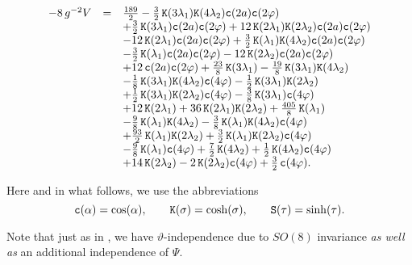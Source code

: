 \documentclass[a4paper,12pt]{article}
\begin{document}
\begin{equation}
\begin{array}{lll}
-8\,g^{-2}V&=&\frac{189}{2}-
\frac{3}{2}\,{\tt K}{\left(3 \lambda_1\right)} {\tt K}{\left(4 \lambda_2\right)} {\tt c}{\left(2 a\right)} {\tt c}{\left(2 \varphi\right)}\\
&&+\frac{3}{2}\,{\tt K}{\left(3 \lambda_1\right)} {\tt c}{\left(2 a\right)} {\tt c}{\left(2 \varphi\right)}
+12\,{\tt K}{\left(2 \lambda_1\right)} {\tt K}{\left(2 \lambda_2\right)} {\tt c}{\left(2 a\right)} {\tt c}{\left(2 \varphi\right)}\\
&&-12\,{\tt K}{\left(2 \lambda_1\right)} {\tt c}{\left(2 a\right)} {\tt c}{\left(2 \varphi\right)}
+\frac{3}{2}\,{\tt K}{\left( \lambda_1\right)} {\tt K}{\left(4 \lambda_2\right)} {\tt c}{\left(2 a\right)} {\tt c}{\left(2 \varphi\right)}\\
&&-\frac{3}{2}\,{\tt K}{\left( \lambda_1\right)} {\tt c}{\left(2 a\right)} {\tt c}{\left(2 \varphi\right)}
-12\,{\tt K}{\left(2 \lambda_2\right)} {\tt c}{\left(2 a\right)} {\tt c}{\left(2 \varphi\right)}\\
&&+12\,{\tt c}{\left(2 a\right)} {\tt c}{\left(2 \varphi\right)}
+\frac{23}{8}\,{\tt K}{\left(3 \lambda_1\right)}
-\frac{19}{8}\,{\tt K}{\left(3 \lambda_1\right)} {\tt K}{\left(4 \lambda_2\right)}\\
&&-\frac{1}{8}\,{\tt K}{\left(3 \lambda_1\right)} {\tt K}{\left(4 \lambda_2\right)} {\tt c}{\left(4 \varphi\right)}
-\frac{1}{2}\,{\tt K}{\left(3 \lambda_1\right)} {\tt K}{\left(2 \lambda_2\right)}\\
&&+\frac{1}{2}\,{\tt K}{\left(3 \lambda_1\right)} {\tt K}{\left(2 \lambda_2\right)} {\tt c}{\left(4 \varphi\right)}
-\frac{3}{8}\,{\tt K}{\left(3 \lambda_1\right)} {\tt c}{\left(4 \varphi\right)}\\
&&+12\,{\tt K}{\left(2 \lambda_1\right)}
+36\,{\tt K}{\left(2 \lambda_1\right)} {\tt K}{\left(2 \lambda_2\right)}
+\frac{405}{8}\,{\tt K}{\left( \lambda_1\right)}\\
&&-\frac{9}{8}\,{\tt K}{\left( \lambda_1\right)} {\tt K}{\left(4 \lambda_2\right)}
-\frac{3}{8}\,{\tt K}{\left( \lambda_1\right)} {\tt K}{\left(4 \lambda_2\right)} {\tt c}{\left(4 \varphi\right)}\\
&&+\frac{93}{2}\,{\tt K}{\left( \lambda_1\right)} {\tt K}{\left(2 \lambda_2\right)}
+\frac{3}{2}\,{\tt K}{\left( \lambda_1\right)} {\tt K}{\left(2 \lambda_2\right)} {\tt c}{\left(4 \varphi\right)}\\
&&-\frac{9}{8}\,{\tt K}{\left( \lambda_1\right)} {\tt c}{\left(4 \varphi\right)}
+\frac{7}{2}\,{\tt K}{\left(4 \lambda_2\right)}
+\frac{1}{2}\,{\tt K}{\left(4 \lambda_2\right)} {\tt c}{\left(4 \varphi\right)}\\
&&+14\,{\tt K}{\left(2 \lambda_2\right)}
-2\,{\tt K}{\left(2 \lambda_2\right)} {\tt c}{\left(4 \varphi\right)}
+\frac{3}{2}\,{\tt c}{\left(4 \varphi\right)}.
\end{array}
\end{equation}

Here and in what follows, we use the abbreviations
\begin{equation}
{\tt c}{\left(\alpha\right)}=\cos(\alpha),\qquad {\tt K}{\left(\sigma\right)}=\cosh(\sigma),\qquad {\tt S}{\left(\tau\right)}=\sinh(\tau).
\end{equation}

Note that just as in \cite{Warner:vz}, we have
$\vartheta$-independence due to $SO(8)$ invariance {\em as well as} an
additional independence of $\Psi$.
\end{document}
